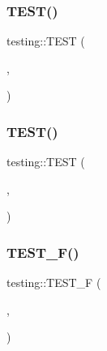 \mbox{\label{namespacetesting_a83dfac108c207258287b9f7aa9171e8a}} 
\subsubsection{\texorpdfstring{TEST()}{TEST()}\hspace{0.1cm}{\footnotesize\ttfamily [6/7]}}
{\footnotesize\ttfamily testing\+::\+T\+E\+ST (\begin{DoxyParamCaption}\item[{Successful\+Assertion\+Test}]{,  }\item[{A\+S\+S\+E\+R\+T\+\_\+\+S\+TR}]{ }\end{DoxyParamCaption})}

\mbox{\label{namespacetesting_af597d0ad4de0197141b78e9c1035e491}} 
\subsubsection{\texorpdfstring{TEST()}{TEST()}\hspace{0.1cm}{\footnotesize\ttfamily [7/7]}}
{\footnotesize\ttfamily testing\+::\+T\+E\+ST (\begin{DoxyParamCaption}\item[{Code\+Location\+For\+T\+E\+ST}]{,  }\item[{Verify}]{ }\end{DoxyParamCaption})}

\mbox{\label{namespacetesting_acd53db89097aba1468724d6446069b1e}} 
\subsubsection{\texorpdfstring{TEST\_F()}{TEST\_F()}\hspace{0.1cm}{\footnotesize\ttfamily [1/48]}}
{\footnotesize\ttfamily testing\+::\+T\+E\+S\+T\+\_\+F (\begin{DoxyParamCaption}\item[{\mbox{\hyperlink{classtesting_1_1TestInfoTest}{Test\+Info\+Test}}}]{,  }\item[{Names}]{ }\end{DoxyParamCaption})}

